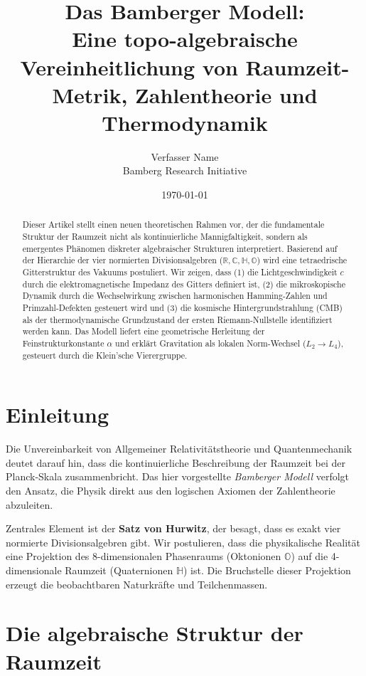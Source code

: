\documentclass[11pt, a4paper]{article}
\title{\textbf{Das Bamberger Modell:}\\ \large Eine topo-algebraische Vereinheitlichung von Raumzeit-Metrik, Zahlentheorie und Thermodynamik}
\author{Verfasser Name \\ \small{Bamberg Research Initiative}}
\date{\today}
\begin{document}
	
	\maketitle
	
	\begin{abstract}
		\noindent
		Dieser Artikel stellt einen neuen theoretischen Rahmen vor, der die fundamentale Struktur der Raumzeit nicht als kontinuierliche Mannigfaltigkeit, sondern als emergentes Phänomen diskreter algebraischer Strukturen interpretiert. Basierend auf der Hierarchie der vier normierten Divisionsalgebren ($\mathbb{R}, \mathbb{C}, \mathbb{H}, \mathbb{O}$) wird eine tetraedrische Gitterstruktur des Vakuums postuliert.
		Wir zeigen, dass (1) die Lichtgeschwindigkeit $c$ durch die elektromagnetische Impedanz des Gitters definiert ist, (2) die mikroskopische Dynamik durch die Wechselwirkung zwischen harmonischen Hamming-Zahlen und Primzahl-Defekten gesteuert wird und (3) die kosmische Hintergrundstrahlung (CMB) als der thermodynamische Grundzustand der ersten Riemann-Nullstelle identifiziert werden kann. Das Modell liefert eine geometrische Herleitung der Feinstrukturkonstante $\alpha$ und erklärt Gravitation als lokalen Norm-Wechsel ($L_2 \to L_4$), gesteuert durch die Klein'sche Vierergruppe.
	\end{abstract}
	
	\section{Einleitung}
	Die Unvereinbarkeit von Allgemeiner Relativitätstheorie und Quantenmechanik deutet darauf hin, dass die kontinuierliche Beschreibung der Raumzeit bei der Planck-Skala zusammenbricht. Das hier vorgestellte \textit{Bamberger Modell} verfolgt den Ansatz, die Physik direkt aus den logischen Axiomen der Zahlentheorie abzuleiten.
	
	Zentrales Element ist der \textbf{Satz von Hurwitz}, der besagt, dass es exakt vier normierte Divisionsalgebren gibt. Wir postulieren, dass die physikalische Realität eine Projektion des 8-dimensionalen Phasenraums (Oktonionen $\mathbb{O}$) auf die 4-dimensionale Raumzeit (Quaternionen $\mathbb{H}$) ist. Die Bruchstelle dieser Projektion erzeugt die beobachtbaren Naturkräfte und Teilchenmassen.
	
	\section{Die algebraische Struktur der Raumzeit}
	
\end{document}

